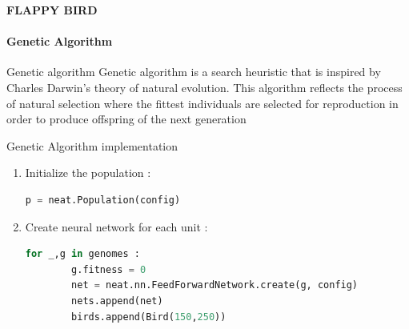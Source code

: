 \documentclass[10pt]{beamer}
\begin{document}
{
%
\begin{frame}[fragile]{\textbf{FLAPPY BIRD}}
        \framesubtitle{\textbf{Genetic Algorithm}}
        \begin{definition}{Genetic algorithm}
            Genetic algorithm is a search heuristic that is inspired by Charles Darwin’s theory of natural evolution. This algorithm reflects the process of natural selection where the fittest individuals are selected for reproduction in order to produce offspring of the next generation
        \end{definition} 
        Genetic Algorithm implementation
        \begin{enumerate}
        \item Initialize the population : 
            \begin{lstlisting}[language=Python]
        p = neat.Population(config)
            \end{lstlisting}
        \pause 
        \item Create neural network for each unit : 
            \begin{lstlisting}[language=Python]
    for _,g in genomes :
        g.fitness = 0
        net = neat.nn.FeedForwardNetwork.create(g, config)
        nets.append(net)
        birds.append(Bird(150,250))
            \end{lstlisting}
        \end{enumerate}
\end{frame}
}
\end{document}
